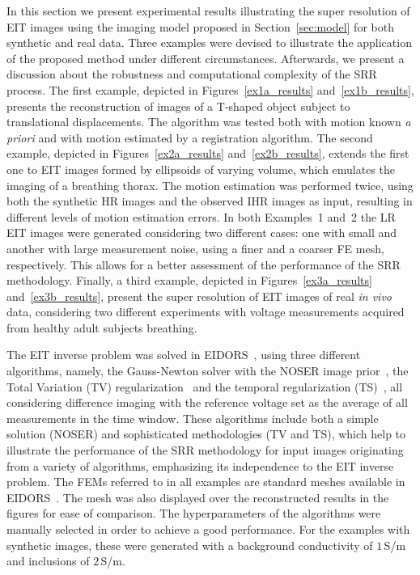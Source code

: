 \documentclass[10pt]{IEEEtran}
\newcommand{\ccyan}{\textcolor{cyan}}
\begin{document}
In this section we present experimental results illustrating the super resolution of EIT images using the imaging model proposed in Section~\ref{sec:model} for both synthetic and real data. Three examples were devised to illustrate the application of the proposed method under different circumstances. Afterwards, we present a discussion about the robustness and computational complexity of the SRR process.
%
The first example, depicted in Figures~\ref{ex1a_results} and~\ref{ex1b_results}, presents the reconstruction of images of a T-shaped object subject to translational displacements. The algorithm was tested both with motion known \textit{a priori} and with motion estimated by a registration algorithm.
%
The second example, depicted in Figures~\ref{ex2a_results} and~\ref{ex2b_results}, extends the first one to EIT images formed by ellipsoids of varying volume, which emulates the imaging of a breathing thorax.
%
The motion estimation was performed twice, using both the synthetic HR images and the observed IHR images as input, resulting in different levels of motion estimation errors.
%
In both Examples~1 and~2 the LR EIT images were generated considering two different cases: one with small and another with large measurement noise, using a finer and a coarser FE mesh, respectively.
%
This allows for a better assessment of the performance of the SRR methodology.
%
Finally, a third example, depicted in Figures~\ref{ex3a_results} and~\ref{ex3b_results}, present the super resolution of EIT images of real \textit{in vivo} data, considering two different experiments with voltage measurements acquired from healthy adult subjects breathing.





The EIT inverse problem was solved in EIDORS~\cite{Adler06eidors}, using three different algorithms, namely, the Gauss-Newton solver with the NOSER image prior~\cite{Cheney1990noser}, the Total Variation (TV) regularization~\cite{borsic2010invivoTV} and the temporal regularization (TS)~\cite{adler2007temporalEIT}, all considering difference imaging with the reference voltage set as the average of all measurements in the time window.
%
These algorithms include both a simple solution (NOSER) and sophisticated methodologies (TV and TS), which help to illustrate the performance of the SRR methodology for input images originating from a variety of algorithms, emphasizing its independence to the EIT inverse problem.
%
The FEMs referred to in all examples are standard meshes available in EIDORS~\cite{Adler06eidors}. The mesh was also displayed over the reconstructed results in the figures for ease of comparison.
%
The hyperparameters of the algorithms were manually selected in order to achieve a good performance.
%
For the examples with synthetic images, these were generated with a background conductivity of $1\,$S/m and inclusions of $2\,$S/m.
\end{document}
